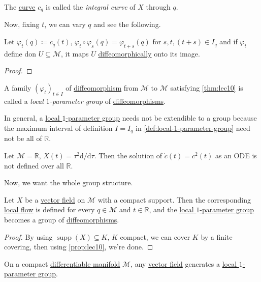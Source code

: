 \begin{definition}\label{def:integral-curve}
	The \hyperref[def:curve]{curve} \(c_q\) is called the \emph{integral curve} of \(X\) through \(q\).
\end{definition}

Now, fixing \(t\), we can vary \(q\) and see the following.

\begin{theorem}\label{thm:lec10}
	Let \(\varphi _t(q) \coloneqq c_q(t)\), \(\varphi _t \circ \varphi _s(q) = \varphi _{t+s}(q)\) for \(s, t, (t+s)\in I_q\) and if \(\varphi _t\) define don \(U \subseteq \mathcal{M} \), it maps \(U\) \hyperref[def:diffeomorphic]{diffeomorphically} onto its image.
\end{theorem}
\begin{proof}
\end{proof}

\begin{definition}\label{def:local-1-parameter-group}
	A family \((\varphi _t)_{t\in I}\) of \hyperref[def:diffeomorphism]{diffeomorphism} from \(\mathcal{M} \) to \(\mathcal{M} \) satisfying \autoref{thm:lec10} is called a \emph{local \(1\)-parameter group} of \hyperref[def:diffeomorphism]{diffeomorphisms}.
\end{definition}

\begin{remark}
	In general, a \hyperref[def:local-1-parameter-group]{local \(1\)-parameter group} needs not be extendible to a group because the maximum interval of definition \(I = I_q\) in \autoref{def:local-1-parameter-group} need not be all of \(\mathbb{R} \).
\end{remark}

\begin{eg}
	Let \(\mathcal{M} = \mathbb{R} \), \(X(t) = \tau ^2 \mathrm{d} / \mathrm{d} \tau \). Then the solution of \(\dot{c}(t) = c^2(t)\) as an ODE is not defined over all \(\mathbb{R} \).
\end{eg}

Now, we want the whole group structure.

\begin{theorem}
	Let \(X\) be a \hyperref[def:vector-field]{vector field} on \(\mathcal{M} \) with a compact support. Then the corresponding \hyperref[def:local-flow]{local flow} is defined for every \(q\in \mathcal{M} \) and \(t\in \mathbb{R} \), and the \hyperref[def:local-1-parameter-group]{local \(1\)-parameter group} becomes a group of \hyperref[def:diffeomorphism]{diffeomorphisms}.
\end{theorem}
\begin{proof}
	By using \(\mathop{\mathrm{supp}}(X) \subseteq K\), \(K\) compact, we can cover \(K\) by a finite covering, then using \autoref{prop:lec10}, we're done.
\end{proof}

\begin{corollary}
	On a compact \hyperref[def:smooth-manifold]{differentiable manifold} \(\mathcal{M} \), any \hyperref[def:vector-field]{vector field} generates a \hyperref[def:local-1-parameter-group]{local \(1\)-parameter group}.
\end{corollary}